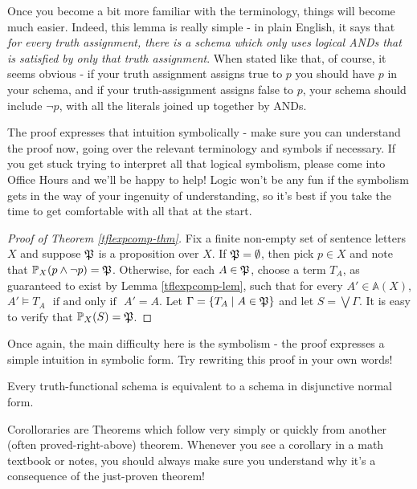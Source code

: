 \begin{aside}
    Once you become a bit more familiar with the terminology, things will become much easier. Indeed, this lemma is really simple - in plain English, it says that \emph{for every truth assignment, there is a schema which only uses logical ANDs that is satisfied by only that truth assignment}. When stated like that, of course, it seems obvious - if your truth assignment assigns true to $p$ you should have $p$ in your schema, and if your truth-assignment assigns false to $p$, your schema should include $\lnot p$, with all the literals joined up together by ANDs. 

    The proof expresses that intuition symbolically - make sure you can understand the proof now, going over the relevant terminology and symbols if necessary. If you get stuck trying to interpret all that logical symbolism, please come into Office Hours and we'll be happy to help! Logic won't be any fun if the symbolism gets in the way of your ingenuity of understanding, so it's best if you take the time to get comfortable with all that at the start. 
\end{aside}

\begin{proof}[Proof of Theorem \ref{tflexpcomp-thm}]
Fix a finite non-empty set of sentence letters $X$ and suppose $\mfp$ is a proposition over $X$. If $\mfp=\emptyset$, then pick $p\in X$ and note that $\prop{p\wedge\neg p}{X} = \mfp$. Otherwise, for each $A\in\mfp$, choose a term $T_A$, as guaranteed to exist by Lemma \ref{tflexpcomp-lem}, such that for every $A'\in\mathbb{A}(X)$, 
$A'\models T_A\ \ \ \mbox{if and only if}\ \ \ A'=A$. Let $\Gamma = \{T_A\mid A\in\mfp\}$ and let $S=\bigvee\Gamma$. It is easy to verify that $\prop{S}{X}=\mfp$.
\end{proof}

\begin{aside}
    Once again, the main difficulty here is the symbolism - the proof expresses a simple intuition in symbolic form. Try rewriting this proof in your own words!
\end{aside}

\begin{corollary}\label{dnf-cor}
Every truth-functional schema is equivalent to a schema in disjunctive normal form.
\end{corollary}

\begin{aside}
    Corolloraries are Theorems which follow very simply or quickly from another (often proved-right-above) theorem. Whenever you see a corollary in a math textbook or notes, you should always make sure you understand why it's a consequence of the just-proven theorem!
\end{aside}